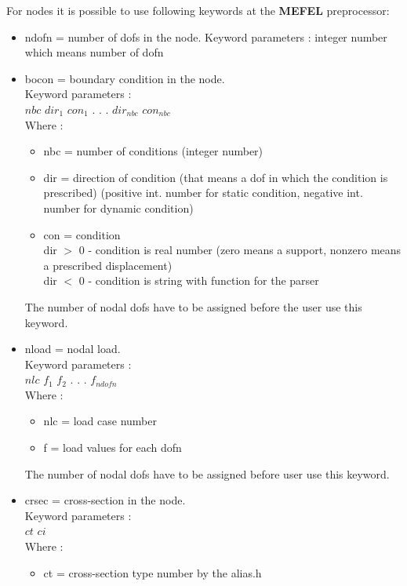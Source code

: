 \documentclass[12pt]{book}
\begin{document}
For nodes it is possible to use following keywords at the {\bf MEFEL} preprocessor:
\begin{itemize}
\item ndofn = number of dofs in the node.
        Keyword parameters : integer number which means number of dofn
\item bocon = boundary condition in the node.\\
        Keyword parameters :\\
        $nbc$ $dir_1$ $con_1$ . . . $dir_{nbc}$ $con_{nbc}$\\
        Where :
        \begin{itemize}
        \item nbc = number of conditions (integer number)
        \item dir = direction of condition (that means a dof in which the condition is prescribed)
              (positive int. number for static condition,
               negative int. number for dynamic condition)
        \item con = condition\\
              dir $>$ 0 - condition is real number
                         (zero means a support, nonzero means a prescribed displacement)\\
              dir $<$ 0 - condition is string with function for the parser\\
        \end{itemize}
        The number of nodal dofs have to be assigned before the user use this keyword.        
\item nload = nodal load.\\
        Keyword parameters :\\
        $nlc$ $f_1$ $f_2$ . . . $f_{ndofn}$\\
        Where :
        \begin {itemize}
        \item nlc = load case number
        \item f   = load values for each dofn
        \end{itemize}
        The number of nodal dofs have to be assigned before user use this keyword.
\item crsec = cross-section in the node.\\
        Keyword parameters :\\
        $ct$ $ci$\\
        Where :
        \begin{itemize}
        \item ct = cross-section type number by the alias.h

\end{itemize}
\end{itemize}
\end{document}
